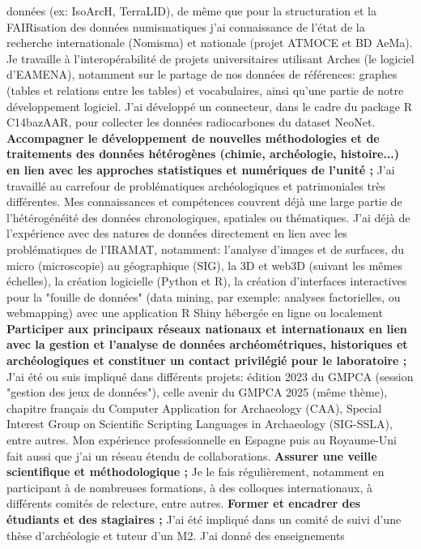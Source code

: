 \documentclass[12pt]{article}
\begin{document}
données (ex: IsoArcH, TerraLID), de même que pour la structuration et la FAIRisation des données numismatiques j'ai
connaissance de l'état de la recherche internationale (Nomisma) et nationale (projet ATMOCE et BD AeMa).
Je travaille à l'interopérabilité de projets universitaires utilisant Arches (le logiciel d'EAMENA), notamment sur le partage de
nos données de références: graphes (tables et relations entre les tables) et vocabulaires, ainsi qu'une partie de notre
développement logiciel.
J'ai développé un connecteur, dans le cadre du package R C14bazAAR, pour collecter les données radiocarbones du
dataset NeoNet.
\smallbreak
\textbf{Accompagner le développement de nouvelles méthodologies et de traitements des données hétérogènes (chimie,
archéologie, histoire...) en lien avec les approches statistiques et numériques de l'unité ;}
J'ai travaillé au carrefour de problématiques archéologiques et patrimoniales très différentes. Mes connaissances et
compétences couvrent déjà une large partie de l'hétérogénéité des données chronologiques, spatiales ou
thématiques. J'ai déjà de l'expérience avec des natures de données directement en lien avec les problématiques de
l'IRAMAT, notamment: l'analyse d'images et de surfaces, du micro (microscopie) au géographique (SIG), la 3D et web3D
(suivant les mêmes échelles), la création logicielle (Python et R), la création d'interfaces interactives pour la "fouille de
données" (data mining, par exemple: analyses factorielles, ou webmapping) avec une application R Shiny hébergée en
ligne ou localement
\smallbreak
\textbf{Participer aux principaux réseaux nationaux et internationaux en lien avec la gestion et l'analyse de données
archéométriques, historiques et archéologiques et constituer un contact privilégié pour le laboratoire ;}
J'ai été ou suis impliqué dans différents projets: édition 2023 du GMPCA (session "gestion des jeux de données"),
celle avenir du GMPCA 2025 (même thème), chapitre français du Computer Application for Archaeology (CAA), Special
Interest Group on Scientific Scripting Languages in Archaeology (SIG-SSLA), entre autres. Mon expérience professionnelle en
Espagne puis au Royaume-Uni fait aussi que j'ai un réseau étendu de collaborations.
\smallbreak
\textbf{Assurer une veille scientifique et méthodologique ;}
Je le fais régulièrement, notamment en participant à de nombreuses formations, à des colloques internationaux, à
différents comités de relecture, entre autres.
\smallbreak
\textbf{Former et encadrer des étudiants et des stagiaires ;}
J'ai été impliqué dans un comité de suivi d'une thèse d'archéologie et tuteur d'un M2. J'ai donné des enseignements
\end{document}
